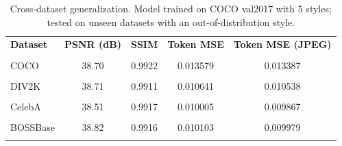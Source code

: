 \begin{table}[t]
\centering
\caption{Cross-dataset generalization. Model trained on COCO val2017 with 5 styles; tested on unseen datasets with an out-of-distribution style.}
\label{tab:cross_dataset}
\begin{tabular}{lcccc}
\toprule
\textbf{Dataset} & \textbf{PSNR (dB)} & \textbf{SSIM} & \textbf{Token MSE} & \textbf{Token MSE (JPEG)} \\\\
\midrule
COCO & 38.70 & 0.9922 & 0.013579 & 0.013387 \\\\
DIV2K & 38.71 & 0.9911 & 0.010641 & 0.010538 \\\\
CelebA & 38.51 & 0.9917 & 0.010005 & 0.009867 \\\\
BOSSBase & 38.82 & 0.9916 & 0.010103 & 0.009979 \\\\
\bottomrule
\end{tabular}
\end{table}
